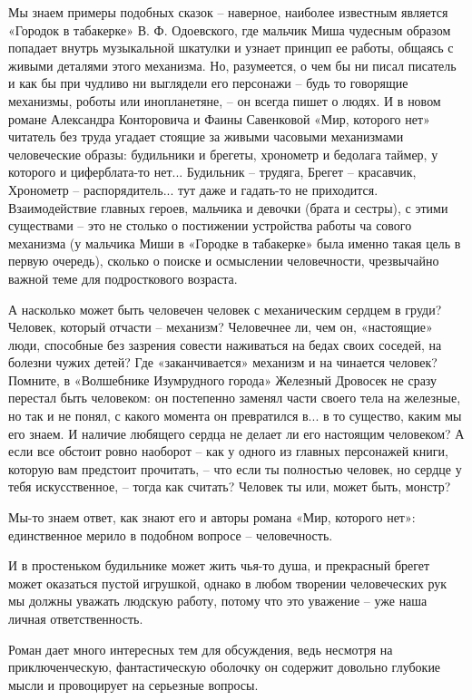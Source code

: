Мы знаем примеры подобных сказок – наверное, наиболее известным является
«Городок в табакерке» В. Ф. Одоевского, где мальчик Миша чудесным образом
попадает внутрь музыкальной шкатулки и узнает принцип ее работы, общаясь с
живыми деталями этого механизма.  Но, разумеется, о чем бы ни писал писатель и
как бы при чудливо ни выглядели его персонажи – будь то говорящие механизмы,
роботы или инопланетяне, – он всегда пишет о людях. И в новом романе Александра
Конторовича и Фаины Савенковой «Мир, которого нет» читатель без труда угадает
стоящие за живыми часовыми механизмами человеческие образы: будильники и
брегеты, хронометр и бедолага таймер, у которого и циферблата-то нет... Будильник
– трудяга, Брегет – красавчик, Хронометр – распорядитель... тут даже и гадать-то
не приходится. Взаимодействие главных героев, мальчика и девочки (брата и
сестры), с этими существами – это не столько о постижении устройства работы ча
сового механизма (у мальчика Миши в «Городке в табакерке» была именно такая
цель в первую очередь), сколько о поиске и осмыслении человечности,
чрезвычайно важной теме для подросткового возраста.

А насколько может быть человечен человек с механическим сердцем в груди?
Человек, который отчасти – механизм? Человечнее ли, чем он, «настоящие» люди,
способные без зазрения совести наживаться на бедах своих соседей, на болезни
чужих детей? Где «заканчивается» механизм и на чинается человек? Помните, в
«Волшебнике Изумрудного города» Железный Дровосек не сразу перестал быть
человеком: он постепенно заменял части своего тела на железные, но так и не
понял, с какого момента он превратился в... в то существо, каким мы его знаем. И
наличие любящего сердца не делает ли его настоящим человеком? А если все
обстоит ровно наоборот – как у одного из главных персонажей книги, которую вам
предстоит прочитать, – что если ты полностью человек, но сердце у тебя
искусственное, – тогда как считать? Человек ты или, может быть, монстр?

Мы-то знаем ответ, как знают его и авторы романа «Мир, которого нет»:
единственное мерило в подобном вопросе – человечность.

И в простеньком будильнике может жить чья-то душа, и прекрасный брегет может
оказаться пустой игрушкой, однако в любом творении человеческих рук мы должны
уважать людскую работу, потому что это уважение – уже наша личная
ответственность.

Роман дает много интересных тем для обсуждения, ведь несмотря на
приключенческую, фантастическую оболочку он содержит довольно глубокие мысли и
провоцирует на серьезные вопросы.

